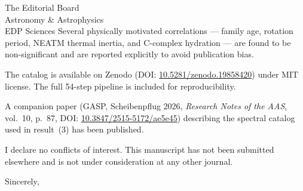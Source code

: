 \documentclass[12pt,a4paper]{letter}
\begin{document}
\begin{letter}{The Editorial Board \\
               Astronomy \& Astrophysics \\
               EDP Sciences}
Several physically motivated correlations --- family age, rotation
period, NEATM thermal inertia, and C-complex hydration --- are found to
be non-significant and are reported explicitly to avoid publication bias.

\medskip
The catalog is available on Zenodo (DOI:
\href{https://doi.org/10.5281/zenodo.19858420}{10.5281/zenodo.19858420})
under MIT license. The full 54-step pipeline is included for
reproducibility.

A companion paper (GASP, Scheibenpflug 2026, \textit{Research Notes of
the AAS}, vol.\ 10, p.\ 87, DOI:
\href{https://doi.org/10.3847/2515-5172/ae5e45}{10.3847/2515-5172/ae5e45})
describing the spectral catalog used in result~(3) has been published.

\medskip
I declare no conflicts of interest. This manuscript has not been
submitted elsewhere and is not under consideration at any other journal.

\closing{Sincerely,}

\end{letter}
\end{document}

